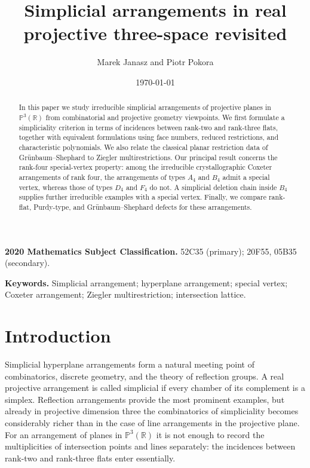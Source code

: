 \documentclass[11pt]{article}
\title{Simplicial arrangements in real projective three-space revisited}
\author{Marek Janasz and Piotr Pokora}
\date{\today}
\theoremstyle{definition}
\theoremstyle{remark}
\newcommand{\PP}{\mathbb P}
\newcommand{\RR}{\mathbb R}
\begin{document}
\maketitle

\begin{abstract}
In this paper we study irreducible simplicial arrangements of projective planes in
$\PP^3(\RR)$ from combinatorial and projective geometry viewpoints.  We
first formulate a simpliciality criterion in terms of incidences between
rank-two and rank-three flats, together with equivalent formulations using
face numbers, reduced restrictions, and characteristic polynomials.  We
also relate the classical planar restriction data of Gr\"unbaum--Shephard
to Ziegler multirestrictions.  Our principal result concerns the rank-four
special-vertex property: among the irreducible crystallographic Coxeter
arrangements of rank four, the arrangements of types $A_4$ and $B_4$ admit
a special vertex, whereas those of types $D_4$ and $F_4$ do not.  A
simplicial deletion chain inside $B_4$ supplies further irreducible
examples with a special vertex.  Finally, we compare rank-flat, Purdy-type,
and Gr\"unbaum--Shephard defects for these arrangements.
\end{abstract}

\medskip
\noindent\textbf{2020 Mathematics Subject Classification.}
52C35 (primary); 20F55, 05B35 (secondary).

\noindent\textbf{Keywords.}
Simplicial arrangement; hyperplane arrangement; special vertex; Coxeter
arrangement; Ziegler multirestriction; intersection lattice.

\section{Introduction}
\label{sec:introduction}

Simplicial hyperplane arrangements form a natural meeting point of
combinatorics, discrete geometry, and the theory of reflection groups.  A
real projective arrangement is called simplicial if every chamber of its
complement is a simplex.  Reflection arrangements provide the most
prominent examples, but already in projective dimension three the
combinatorics of simpliciality becomes considerably richer than in the case
of line arrangements in the projective plane.  For an arrangement of
planes in $\PP^3(\RR)$ it is not enough to record the multiplicities of
intersection points and lines separately: the incidences between rank-two
and rank-three flats enter essentially.
\end{document}
